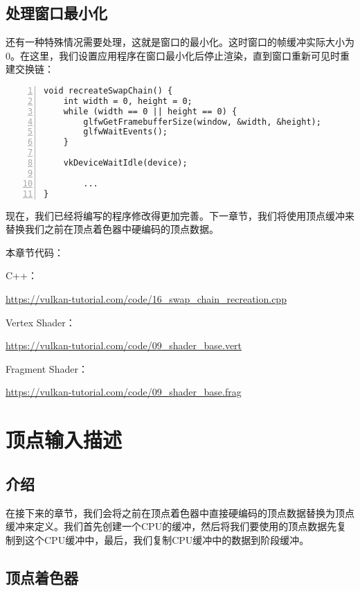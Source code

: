 \documentclass{ctexart}
\begin{document}
\subsection{处理窗口最小化}

还有一种特殊情况需要处理，这就是窗口的最小化。这时窗口的帧缓冲实际大小为0。在这里，我们设置应用程序在窗口最小化后停止渲染，直到窗口重新可见时重建交换链：

\begin{lstlisting}[language={[ANSI]C},keywordstyle=\color{blue!70},commentstyle=\color{red!50!green!50!blue!50},frame=shadowbox, rulesepcolor=\color{red!20!green!20!blue!20},basicstyle=\small,numbers=left, numberstyle=\tiny,breaklines=true]
void recreateSwapChain() {
	int width = 0, height = 0;
	while (width == 0 || height == 0) {
		glfwGetFramebufferSize(window, &width, &height);
		glfwWaitEvents();
	}

	vkDeviceWaitIdle(device);

		...
}
\end{lstlisting}

现在，我们已经将编写的程序修改得更加完善。下一章节，我们将使用顶点缓冲来替换我们之前在顶点着色器中硬编码的顶点数据。

本章节代码：

C++：

\url{https://vulkan-tutorial.com/code/16_swap_chain_recreation.cpp}

Vertex Shader：

\url{https://vulkan-tutorial.com/code/09_shader_base.vert}

Fragment Shader：

\url{https://vulkan-tutorial.com/code/09_shader_base.frag}

\newpage
\section{顶点输入描述}

\subsection{介绍}

在接下来的章节，我们会将之前在顶点着色器中直接硬编码的顶点数据替换为顶点缓冲来定义。我们首先创建一个CPU的缓冲，然后将我们要使用的顶点数据先复制到这个CPU缓冲中，最后，我们复制CPU缓冲中的数据到阶段缓冲。

\subsection{顶点着色器}
\end{document}
